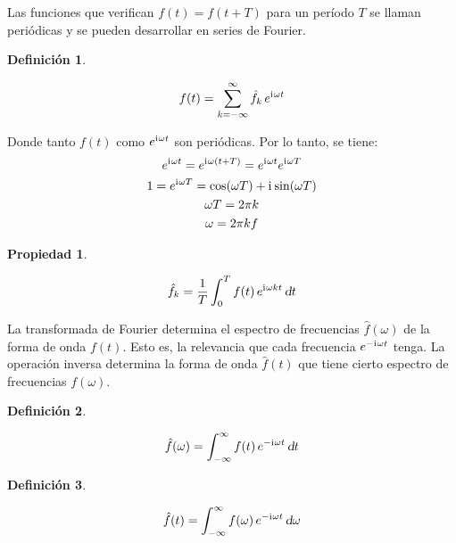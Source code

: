 \documentclass[a5paper,12pt,twoside]{book}
\newtheorem{defn}{{Definición}}[chapter]
\newtheorem{prop}{{Propiedad}}[chapter]
\begin{document}
Las funciones que verifican $f(t)=f(t+T)$ para un período $T$ se llaman periódicas y se pueden desarrollar en series de Fourier.

\begin{mdframed}[style=MyFrame1]
    \begin{defn}
    \end{defn}
    \begin{equation*}
        f(t) = \sum_{k=-\infty}^{\infty} \hat{f}_k \, e^{\mathrm{i}\mkern1mu \omega t}
    \end{equation*}
\end{mdframed}

Donde tanto $f(t)$ como $e^{\mathrm{i}\mkern1mu \omega t}$ son periódicas. Por lo tanto, se tiene:
\begin{gather*}
    e^{\mathrm{i}\mkern1mu \omega t} = e^{\mathrm{i}\mkern1mu \omega (t+T)} = e^{\mathrm{i}\mkern1mu \omega t} e^{\mathrm{i}\mkern1mu \omega T}
    \\
    1 = e^{\mathrm{i}\mkern1mu \omega T} = \cos(\omega T) + \mathrm{i}\mkern1mu \sin(\omega T)
    \\
    \omega T = 2 \pi k
    \\
    \omega = 2 \pi k f
\end{gather*}

\begin{mdframed}[style=MyFrame1]
    \begin{prop}
    \end{prop}
    \begin{equation*}
        \hat{f}_k = \frac{1}{T} \int_0^T f(t) \, e^{\mathrm{i}\mkern1mu \omega k t} \, \textsl{d} t
    \end{equation*}
\end{mdframed}

La transformada de Fourier determina el espectro de frecuencias $\hat{f}(\omega)$ de la forma de onda $f(t)$. Esto es, la relevancia que cada frecuencia $e^{-\mathrm{i}\mkern1mu \omega t}$ tenga. La operación inversa determina la forma de onda $\hat{f}(t)$ que tiene cierto espectro de frecuencias $f(\omega)$.

\begin{mdframed}[style=MyFrame1]
    \begin{defn}
    \end{defn}
    \begin{equation*}
        \hat{f}(\omega) = \int_{-\infty}^{\infty} f(t) \, e^{-\mathrm{i}\mkern1mu \omega t} \, \textsl{d} t
    \end{equation*}
\end{mdframed}

\begin{mdframed}[style=MyFrame1]
    \begin{defn}
    \end{defn}
    \begin{equation*}
        \hat{f}(t) = \int_{-\infty}^{\infty} f(\omega) \, e^{-\mathrm{i}\mkern1mu \omega t} \, \textsl{d} \omega
    \end{equation*}
\end{mdframed}
\end{document}
